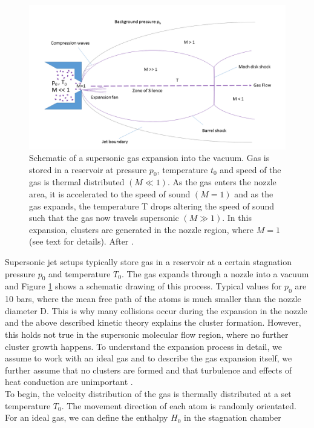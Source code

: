 \begin{figure}
	\centering
		\includegraphics[width=1.00\textwidth]{images/freeJetExpansion.png}
	\caption[Schematic of a supersonic gas expansion into a vacuum.]{Schematic of a supersonic gas expansion into the vacuum. Gas is stored in a reservoir at pressure $p_{0}$, temperature $t_{0}$ and speed of the gas is thermal distributed $\left(M\ll 1\right)$. As the gas enters the nozzle area, it is accelerated to the speed of sound $\left(M=1\right)$ and as the gas expands, the temperature T drops altering the speed of sound such that the gas now travels supersonic $\left(M\gg 1\right)$. In this expansion, clusters are generated in the nozzle region, where $M=1$ (see text for details). After \citep{Miller-1988-Oxford}.}
	\label{fig:freeJetExpansion}
\end{figure}
Supersonic jet setups typically store gas in a reservoir at a certain stagnation pressure $p_{0}$ and temperature $T_{0}$. The gas expands through a nozzle into a vacuum and Figure \ref{fig:freeJetExpansion} shows a schematic drawing of this process. Typical values for $p_{0}$ are 10 bars, where the mean free path of the atoms is much smaller than the nozzle diameter D. This is why many collisions occur during the expansion in the nozzle and the above described kinetic theory explains the cluster formation. However, this holds not true in the supersonic molecular flow region, where no further cluster growth happens. To understand the expansion process in detail, we assume to work with an ideal gas and to describe the gas expansion itself, we further assume that no clusters are formed and that turbulence and effects of heat conduction are unimportant \cite{Yamada-2001-SciDir,Haberland-1994-Springer}.\\
To begin, the velocity distribution of the gas is thermally distributed at a set temperature $T_{0}$. The movement direction of each atom is randomly orientated. For an ideal gas, we can define the enthalpy $H_{0}$ in the stagnation chamber
